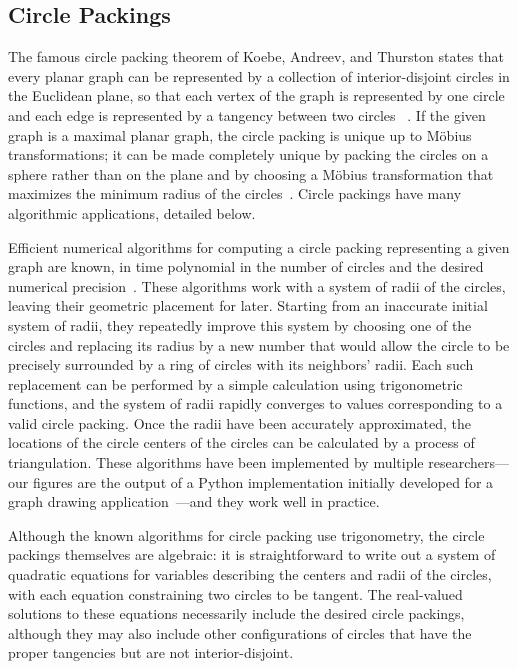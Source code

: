 \documentclass[oribibl,10pt]{llncs}
\begin{document}
\begin{appendix}
\subsection{Circle Packings}
The famous circle packing theorem of Koebe, Andreev, and Thurston states that every planar graph can be represented by a collection of interior-disjoint circles in the Euclidean plane, so that each vertex of the graph is represented by one circle and each edge is represented by a tangency between two circles~\cite{Koe-BSAWL-36} . If the given graph is a maximal planar graph, the circle packing is unique up to M\"obius transformations; it can be made completely unique by packing the circles on a sphere rather than on the plane and by choosing a M\"obius transformation that maximizes the minimum radius of the circles~.
Circle packings have many algorithmic applications, detailed below.

Efficient numerical algorithms for computing a circle packing representing a given graph are known, in time polynomial in the number of circles and the desired numerical precision~. These algorithms work with a system of radii of the circles, leaving their geometric placement for later. Starting from an inaccurate initial system of radii, they repeatedly improve this system by choosing one of the circles and replacing its radius by a new number that would allow the circle to be precisely surrounded by a ring of circles with its neighbors' radii. Each such replacement can be performed by a simple calculation using trigonometric functions, and the system of radii rapidly converges to values corresponding to a valid circle packing. Once the radii have been accurately approximated, the locations of the circle centers of the circles can be calculated by a process of triangulation. These algorithms have been implemented by multiple researchers---our figures are the output of a Python implementation initially developed for a graph drawing application~---and they work well in practice.

Although the known algorithms for circle packing use trigonometry, the circle packings themselves are algebraic: it is straightforward to write out a system of quadratic equations for variables describing the centers and radii of the circles, with each equation constraining two circles to be tangent.  The real-valued solutions to these equations necessarily include the desired circle packings, although they may also include other configurations of circles that have the proper tangencies but are not interior-disjoint.


\end{appendix}
\end{document}
